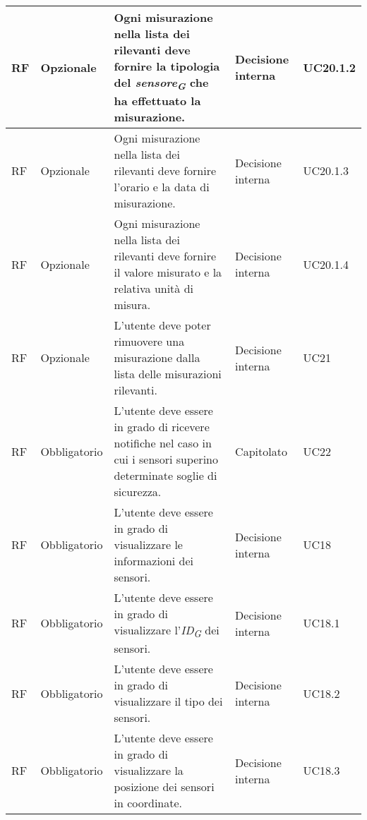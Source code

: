 \begin{longtable}{|C{1.5cm}|C{2cm}|L{5cm}|C{2cm}|C{1.5cm}|}
    \hline
     RF & Opzionale & Ogni misurazione nella lista dei rilevanti deve fornire la tipologia del \textit{sensore}\textsubscript{\textit{G}} che ha effettuato la misurazione.& Decisione interna & UC20.1.2 \\

    \hline
     RF & Opzionale & Ogni misurazione nella lista dei rilevanti deve fornire l'orario e la data di misurazione.& Decisione interna & UC20.1.3 \\

    \hline
     RF & Opzionale & Ogni misurazione nella lista dei rilevanti deve fornire il valore misurato e la relativa unità di misura.& Decisione interna & UC20.1.4 \\

    \hline
     RF & Opzionale & L'utente deve poter rimuovere una misurazione dalla lista delle misurazioni rilevanti.& Decisione interna & UC21 \\

    \hline
     RF & Obbligatorio & L'utente deve essere in grado di ricevere notifiche nel caso in cui i sensori superino determinate soglie di sicurezza.& Capitolato & UC22 \\

    \hline
     RF & Obbligatorio & L'utente deve essere in grado di visualizzare le informazioni dei sensori.& Decisione interna & UC18 \\

    \hline
     RF & Obbligatorio & L'utente deve essere in grado di visualizzare l'\textit{ID}\textsubscript{\textit{G}} dei sensori.& Decisione interna  & UC18.1 \\

    \hline
     RF & Obbligatorio & L'utente deve essere in grado di visualizzare il tipo dei sensori.& Decisione interna & UC18.2 \\

    \hline
     RF & Obbligatorio & L'utente deve essere in grado di visualizzare la posizione dei sensori in coordinate.& Decisione interna & UC18.3 \\


\end{longtable}

